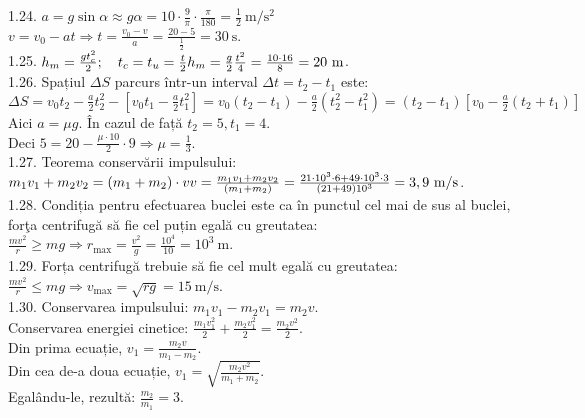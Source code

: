 1.24. $a=g \sin \alpha \approx g \alpha=10 \cdot \frac{9}{\pi} \cdot \frac{\pi}{180}=\frac{1}{2} \mathrm{~m} / \mathrm{s}^{2}$\\ $v=v_{0}-a t \Rightarrow t=\frac{v_{0}-v}{a}=\frac{20-5}{\frac{1}{2}}=30 \mathrm{~s}$.\\

1.25. $h_{m}=\frac{g t_{c}^{2}}{2}; \quad t_{c}=t_{u}=\frac{t}{2}\\ h_{m}=\frac{g}{2} \frac{t^{2}}{4}=\frac{10 \cdot 16}{8}=20 \mathrm{~m}$.\\

1.26. Spațiul $\Delta S$ parcurs într-un interval $\Delta t=t_{2}-t_{1}$ este:\\ $\Delta S =v_{0} t_{2}-\frac{a}{2} t_{2}^{2}-\left[v_{0} t_{1}-\frac{a}{2} t_{1}^{2}\right]=v_{0}\left(t_{2}-t_{1}\right)-\frac{a}{2}\left(t_{2}^{2}-t_{1}^{2}\right)=\left(t_{2}-t_{1}\right)\left[v_{0}-\frac{a}{2}\left(t_{2}+t_{1}\right)\right]$\\ Aici $a=\mu g$. În cazul de față $t_{2}=5, t_{1}=4$.\\ Deci $5=20-\frac{\mu \cdot 10}{2} \cdot 9 \Rightarrow \mu=\frac{1}{3}$.\\

1.27. Teorema conservării impulsului: $m_{1} v_{1}+m_{2} v_{2}=\left(m_{1}+m_{2}\right) \cdot v\\ v=\frac{m_{1} v_{1}+m_{2} v_{2}}{\left(m_{1}+m_{2}\right)}=\frac{21 \cdot 10^{3} \cdot 6+49 \cdot 10^{3} \cdot 3}{(21+49) 10^{3}}=3,9 \mathrm{~m} / \mathrm{s}$.\\

1.28. Condiția pentru efectuarea buclei este ca în punctul cel mai de sus al buclei, forţa centrifugă să fie cel puțin egală cu greutatea:\\ $\frac{m v^{2}}{r} \geq m g \Rightarrow r_{\max }=\frac{v^{2}}{g}=\frac{10^{4}}{10}=10^{3} \mathrm{~m}$.\\

1.29. Forța centrifugă trebuie să fie cel mult egală cu greutatea:\\ $\frac{m v^{2}}{r} \leq m g \Rightarrow v_{\max }=\sqrt{r g}=15 \mathrm{~m} / \mathrm{s}$.\\

1.30. Conservarea impulsului: $m_{1} v_{1}-m_{2} v_{1}=m_{2} v$.\\ Conservarea energiei cinetice: $\frac{m_{1} v_{1}^{2}}{2}+\frac{m_{2} v_{1}^{2}}{2}=\frac{m_{2} v^{2}}{2}$.\\ Din prima ecuație, $v_{1}=\frac{m_{2} v}{m_{1}-m_{2}}$.\\ Din cea de-a doua ecuație, $v_{1}=\sqrt{\frac{m_{2} v^{2}}{m_{1}+m_{2}}}$.\\ Egalându-le, rezultă: $\frac{m_{2}}{m_{1}}=3$.\\

